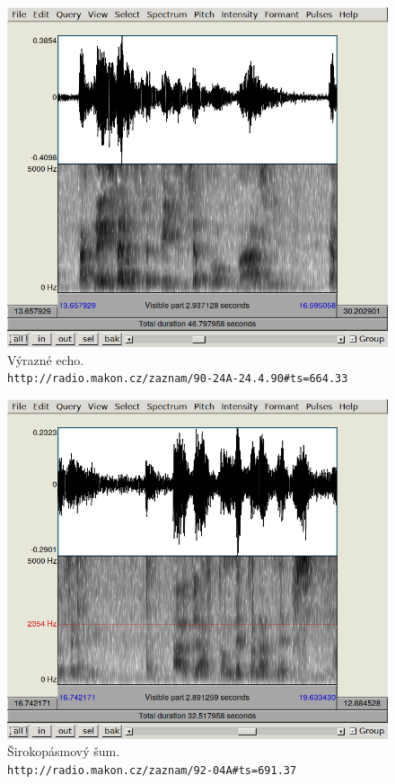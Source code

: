 \begin{figure}[htpb]
\includegraphics[scale=0.89]{rc/spectrum-echo-90-24A.png}
\caption{
    Výrazné echo.\\
    \texttt{http://radio.makon.cz/zaznam/90-24A-24.4.90\#ts=664.33}
}
\label{fig:spectr-echo}
\end{figure}

\begin{figure}[htpb]
\includegraphics[scale=0.89]{rc/spectrum-noise-92-04A.png}
\caption{
    Širokopásmový šum.\\
    \texttt{http://radio.makon.cz/zaznam/92-04A\#ts=691.37}
}
\label{fig:spectr-noise}
\end{figure}


